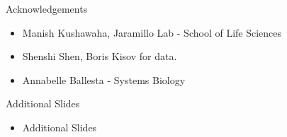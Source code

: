 \documentclass{beamer}
\begin{document}
  \begin{frame}{Acknowledgements}
  \begin{itemize}
  \item Manish Kushawaha, Jaramillo Lab - School of Life Sciences
  \item Shenshi Shen, Boris Kisov for data.
  \item Annabelle Ballesta - Systems Biology
  \end{itemize}
  \end{frame}
    
  \begin{frame}{Additional Slides}
  \Huge
  \begin{itemize}
  \item Additional Slides
  \end{itemize}
  \end{frame}
  
  
\end{document}
